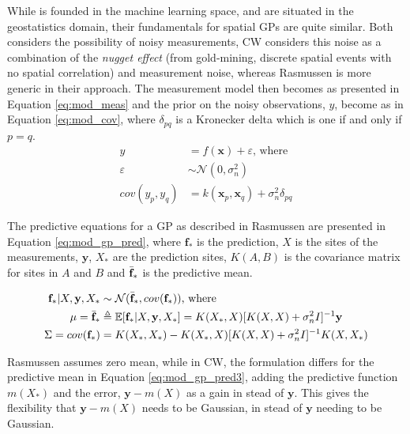 While \textcite{rasmussen2003gaussian} is founded in the machine learning space, \textcite{cressie2015statistics} and \textcite{eidsvik2015value} are situated in the geostatistics domain, their fundamentals for spatial GPs are quite similar. Both considers the possibility of noisy measurements, CW considers this noise as a combination of the \textit{nugget effect} (from gold-mining, discrete spatial events with no spatial correlation) and measurement noise, whereas Rasmussen is more generic in their approach. The measurement model then becomes as presented in Equation \eqref{eq:mod_meas} and the prior on the noisy observations, $y$, become as in Equation \eqref{eq:mod_cov}, where $\delta_{pq}$ is a Kronecker delta which is one if and only if $p=q$.
\begin{align}
    \label{eq:mod_meas}
    y &= f(\mathbf{x}) + \varepsilon \text{, where} \\ 
    \varepsilon &\sim \mathcal{N}(0,\sigma_n^2) \\ 
    \label{eq:mod_cov}
    cov(y_p,y_q) &= k(\mathbf{x}_p,\mathbf{x}_q) + \sigma_n^2 \delta_{pq}
\end{align}

The predictive equations for a GP as described in Rasmussen are presented in Equation \eqref{eq:mod_gp_pred}, where $\mathbf{f}_*$ is the prediction, $X$ is the sites of the measurements, $\mathbf{y}$, $X_*$ are the prediction sites, $K(A,B)$ is the covariance matrix for sites in $A$ and $B$ and $\Bar{\mathbf{f}}_*$ is the predictive mean.  

\begin{align}
    \label{eq:mod_gp_pred}
    \mathbf{f}_*|X,\mathbf{y},X_* &\sim \mathcal{N}(\Bar{\mathbf{f}}_*,cov(\mathbf{f}_*))\text{, where} \\ 
    \label{eq:mod_gp_pred2}
    \mathbf{\mu} = \Bar{\mathbf{f}}_* &\triangleq \mathbb{E}[\mathbf{f}_*|X,\mathbf{y},X_*] = K(X_*,X)[K(X,X)+\sigma_n^2 I]^{-1}\mathbf{y} \\
    \label{eq:mod_gp_pred3}
    \Sigma = cov(\mathbf{f}_*) &= K(X_*,X_*) - K(X_*,X)[K(X,X)+\sigma_n^2 I]^{-1}K(X,X_*)
\end{align}


Rasmussen assumes zero mean, while in CW, the formulation differs for the predictive mean in Equation \eqref{eq:mod_gp_pred3}, adding the predictive function $m(X_*)$ and the error, $\mathbf{y} - m(X)$ as a gain in stead of $\mathbf{y}$. This gives the flexibility that $\mathbf{y} - m(X)$ needs to be Gaussian, in stead of $\mathbf{y}$ needing to be Gaussian.  


